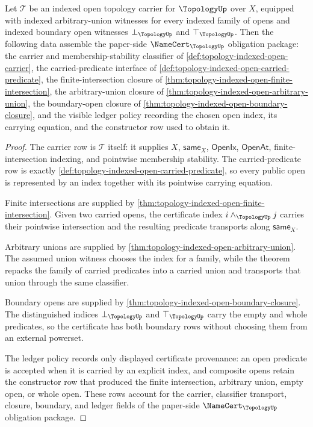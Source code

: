 \begin{theorem}
\label{thm:topology-namecert-obligation-package}
Let $\mathcal{T}$ be an indexed open topology carrier for $\TopologyUp$ over $X$, equipped with indexed arbitrary-union witnesses for every indexed family of opens and indexed boundary open witnesses $\bot_{\TopologyUp}$ and $\top_{\TopologyUp}$. Then the following data assemble the paper-side $\NameCert_{\TopologyUp}$ obligation package: the carrier and membership-stability classifier of \autoref{def:topology-indexed-open-carrier}, the carried-predicate interface of \autoref{def:topology-indexed-open-carried-predicate}, the finite-intersection closure of \autoref{thm:topology-indexed-open-finite-intersection}, the arbitrary-union closure of \autoref{thm:topology-indexed-open-arbitrary-union}, the boundary-open closure of \autoref{thm:topology-indexed-open-boundary-closure}, and the visible ledger policy recording the chosen open index, its carrying equation, and the constructor row used to obtain it.
\end{theorem}
\begin{proof}
The carrier row is $\mathcal{T}$ itself: it supplies $X$, $\mathsf{same}_X$, $\mathsf{OpenIx}$, $\mathsf{OpenAt}$, finite-intersection indexing, and pointwise membership stability. The carried-predicate row is exactly \autoref{def:topology-indexed-open-carried-predicate}, so every public open is represented by an index together with its pointwise carrying equation.

Finite intersections are supplied by \autoref{thm:topology-indexed-open-finite-intersection}. Given two carried opens, the certificate index $i\wedge_{\TopologyUp}j$ carries their pointwise intersection and the resulting predicate transports along $\mathsf{same}_X$.

Arbitrary unions are supplied by \autoref{thm:topology-indexed-open-arbitrary-union}. The assumed union witness chooses the index for a family, while the theorem repacks the family of carried predicates into a carried union and transports that union through the same classifier.

Boundary opens are supplied by \autoref{thm:topology-indexed-open-boundary-closure}. The distinguished indices $\bot_{\TopologyUp}$ and $\top_{\TopologyUp}$ carry the empty and whole predicates, so the certificate has both boundary rows without choosing them from an external powerset.

The ledger policy records only displayed certificate provenance: an open predicate is accepted when it is carried by an explicit index, and composite opens retain the constructor row that produced the finite intersection, arbitrary union, empty open, or whole open. These rows account for the carrier, classifier transport, closure, boundary, and ledger fields of the paper-side $\NameCert_{\TopologyUp}$ obligation package.
\end{proof}

